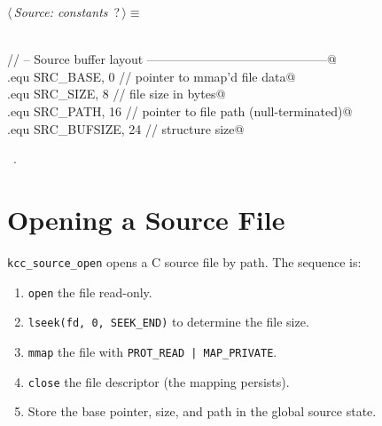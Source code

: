 \documentclass[11pt,a4paper,twoside,openright,DIV=15]{scrbook}
\theoremstyle{definition}
\theoremstyle{plain}
\theoremstyle{remark}
\begin{document}
\begin{flushleft} \small
\begin{minipage}{\linewidth}\label{scrap51}\raggedright\small
{} $\langle\,${\itshape Source: constants}\nobreak\ {\footnotesize {?}}$\,\rangle\equiv$
\vspace{-1ex}
\begin{list}{}{} \item
\mbox{}\verb@@\\
\mbox{}\verb@// -- Source buffer layout --------------------------------------------@\\
\mbox{}\verb@.equ SRC_BASE,      0         // pointer to mmap'd file data@\\
\mbox{}\verb@.equ SRC_SIZE,      8         // file size in bytes@\\
\mbox{}\verb@.equ SRC_PATH,     16         // pointer to file path (null-terminated)@\\
\mbox{}\verb@.equ SRC_BUFSIZE,  24         // structure size@\\
\mbox{}\verb@@{\NWsep}
\end{list}
\vspace{-1.5ex}
\footnotesize
\begin{list}{}{\setlength{\itemsep}{-\parsep}\setlength{\itemindent}{-\leftmargin}}
\item \NWtxtMacroRefIn\ .

\item{}
\end{list}
\end{minipage}\vspace{4ex}
\end{flushleft}
\section{Opening a Source File}

\texttt{kcc\_source\_open} opens a C source file by path.  The
sequence is:
\begin{enumerate}
\item \texttt{open} the file read-only.
\item \texttt{lseek(fd, 0, SEEK\_END)} to determine the file size.
\item \texttt{mmap} the file with \texttt{PROT\_READ | MAP\_PRIVATE}.
\item \texttt{close} the file descriptor (the mapping persists).
\item Store the base pointer, size, and path in the global source state.
\end{enumerate}
\end{document}
